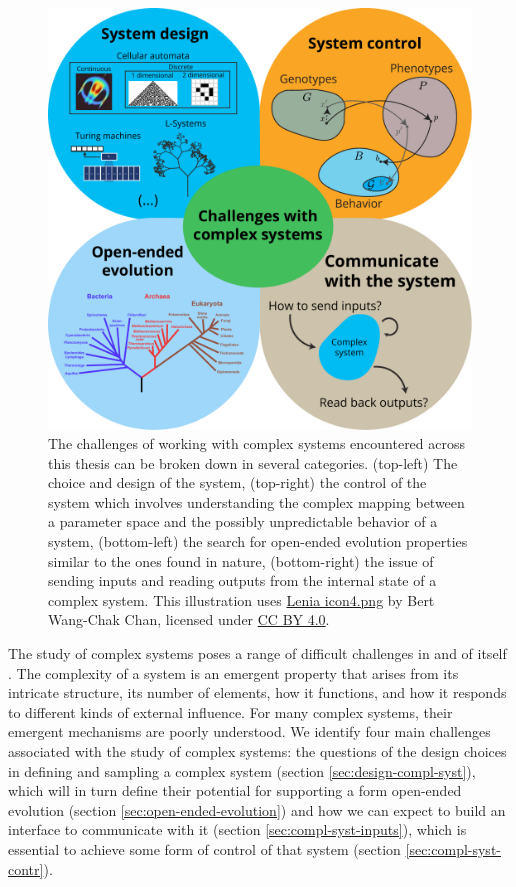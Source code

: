 \begin{figure}[htbp]
  \centering
  \includegraphics[width=.98\linewidth]{figures/challenges}
  \caption{The challenges of working with complex systems encountered across
    this thesis can be broken down in several categories. (top-left) The choice
    and design of the system, (top-right) the control of the system which
    involves understanding the complex mapping between a parameter space and the
    possibly unpredictable behavior of a system, (bottom-left) the search for
    open-ended evolution properties similar to the ones found in nature,
    (bottom-right) the issue of sending inputs and reading outputs from the
    internal state of a complex system. This illustration uses
    \href{https://commons.wikimedia.org/wiki/File:Lenia_icon4.png}{Lenia
      icon4.png} by Bert Wang-Chak Chan, licensed under
    \href{https://creativecommons.org/licenses/by-sa/4.0/}{CC BY 4.0}. }
  \label{fig:challenges}
\end{figure}

The study of complex systems poses a range of difficult challenges in and of
itself \parencite{sanmiguelChallengesComplexSystems2012}. The complexity of a
system is an emergent property that arises from its intricate structure, its
number of elements, how it functions, and how it responds to different kinds of
external influence. For many complex systems, their emergent mechanisms are
poorly understood. We identify four main challenges associated with the study of
complex systems: the questions of the design choices in defining and sampling a
complex system (section \ref{sec:design-compl-syst}), which will in turn define
their potential for supporting a form open-ended evolution (section
\ref{sec:open-ended-evolution}) and how we can expect to build an interface to
communicate with it (section \ref{sec:compl-syst-inputs}), which is essential to
achieve some form of control of that system (section \ref{sec:compl-syst-contr}).

